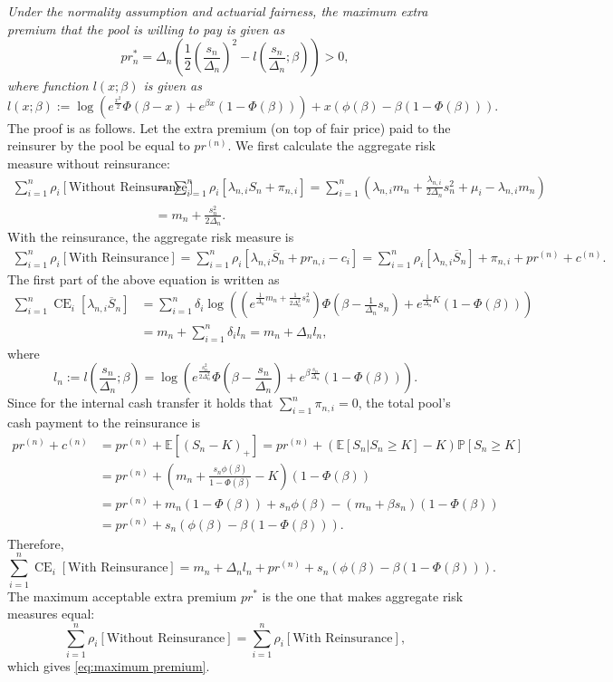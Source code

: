 \documentclass[fleqn,mnsc,nonblindrev]{informs4}
\newcommand{\CE}{\operatorname{CE}}
\newcommand{\EE}{\mathbb{E}}
\newcommand{\prob}[1]{\mathbb{P}[#1]}
\begin{document}
{\it Under the normality assumption and actuarial fairness, the maximum extra premium that the pool is willing to pay is given as
\begin{equation}\label{eq:maximum premium}
pr^*_n= \Delta_n\left(\frac{1}{2}\left(\frac{s_{n}}{\Delta_{n}}\right)^2- l\left(\frac{s_{n}}{\Delta_{n}};\beta\right)\right)>0,
\end{equation}
where function $l(x;\beta)$ is given as
\[
l(x;\beta):=\log\left(e^{\frac{x^2}{2}}\Phi\left(\beta-x\right)+e^{\beta x}(1-\Phi(\beta))\right)+ x\left(\phi(\beta)-\beta(1-\Phi(\beta))\right).
\]
}
The proof is as follows. Let the extra premium (on top of fair price) paid to the reinsurer by the pool be equal to $pr^{(n)}$. We first calculate the aggregate risk measure without reinsurance:
\begin{align*}
\sum_{i=1}^n \rho_i[\textrm{Without Reinsurance}]&=\sum_{i=1}^n\rho_i\left[\lambda_{n,i}S_n+\pi_{n,i}\right]=\sum_{i=1}^n\left(\lambda_{n,i}m_{n}+\frac{\lambda_{n,i}}{2\Delta_{n}}s_{n}^2+\mu_i-\lambda_{n,i}m_{n}\right)\\
&=m_n+\frac{s_{n}^2}{2\Delta_{n}}.
\end{align*}
With the reinsurance, the aggregate risk measure is
\begin{align*}
\sum_{i=1}^n\rho_i[\textrm{With Reinsurance}]=\sum_{i=1}^n\rho_i\left[\lambda_{n,i}\overline{S}_{n}+pr_{n,i}-c_i\right]=\sum_{i=1}^n\rho_i\left[\lambda_{n,i}\overline{S}_{n}\right]+\pi_{n,i}+pr^{(n)}+c^{(n)}.
\end{align*}
The first part of the above equation is written as 
\begin{align*}
\sum_{i=1}^n\CE_i\left[\lambda_{n,i}\overline{S}_{n}\right]
&=\sum_{i=1}^n\delta_i\log\left(\left(e^{\frac{1}{\Delta_{n}}m_n+\frac{1}{2\Delta_{n}^2}s_{n}^2}\right)\Phi\left(\beta-\frac{1}{\Delta_{n}}s_{n}\right)+e^{\frac{1}{\Delta_{n}}K}(1-\Phi(\beta))\right)\\
&=m_n+\sum_{i=1}^n\delta_i l_{n}=m_n+\Delta_nl_n,
\end{align*}
where \[l_n:=l\left(\frac{s_{n}}{\Delta_{n}};\beta\right)=\log\left(e^{\frac{s_{n}^2}{2\Delta_{n}^2}}\Phi\left(\beta-\frac{s_{n}}{\Delta_{n}}\right)+e^{\beta\frac{s_{n}}{\Delta_{n}}}(1-\Phi(\beta))\right).\]
Since for the internal cash transfer it holds that $\sum_{i=1}^n\pi_{n,i}=0$, the total pool's cash payment to the reinsurance is 
\begin{align*}
pr^{(n)}+c^{(n)}&=pr^{(n)}+\EE[ (S_n-K)_+]=pr^{(n)}+(\EE[S_n|S_n\geq K]-K)\prob{S_n\geq K}\\
&=pr^{(n)}+\left(m_n+\frac{s_n\phi(\beta)}{1-\Phi(\beta)}-K\right)(1-\Phi(\beta))\\
&=pr^{(n)}+m_n(1-\Phi(\beta))+s_n\phi(\beta)-(m_n+\beta s_n)(1-\Phi(\beta))\\
&=pr^{(n)}+s_n(\phi(\beta)-\beta (1-\Phi(\beta))).
\end{align*}
Therefore,
\[
\sum_{i=1}^n\CE_i[\textrm{With Reinsurance}]=m_n+\Delta_nl_{n}+pr^{(n)}+s_n(\phi(\beta)-\beta (1-\Phi(\beta))).
\]
The maximum acceptable extra premium $pr^*$ is the one that makes aggregate risk measures equal:
\[\sum_{i=1}^n \rho_i[\textrm{Without Reinsurance}]=\sum_{i=1}^n \rho_i[\textrm{With Reinsurance}],\]
which gives \eqref{eq:maximum premium}.
\end{document}
